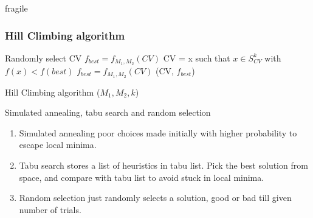 \documentclass{beamer}
\begin{document}
\begin{frame}{fragile}
\frametitle{Hill Climbing algorithm}
\begin{algorithm}[H]
  \begin{algorithmic}[1]
    \State Randomly select CV
    \State $f_{best} = f_{M_{1}, M_{2}}(CV)$
    \State CV = x such that $x \in S^{k}_{CV}$ with $f(x) < f(best)$
    \State $f_{best} = f_{M_{1}, M_{2}}(CV)$
    \EndWhile
    \State \Return (CV, $f_{best}$)
  \end{algorithmic}
  \caption{Hill Climbing algorithm ($M_{1}, M_{2}, k$)}
\end{algorithm}
\end{frame}

\begin{frame}{Simulated annealing, tabu search and random selection}
\begin{enumerate}
\item Simulated annealing poor choices made initially with higher probability to escape local
minima.
\item Tabu search stores a list of heuristics in tabu list. Pick the best solution from space,
and compare with tabu list to avoid stuck in local minima.
\item Random selection just randomly selects a solution, good or bad till given number of trials.
\end{enumerate}
\end{frame}

\end{document}
